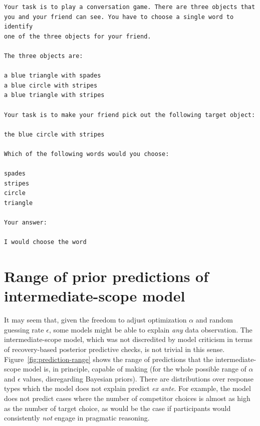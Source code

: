 \documentclass[fleqn]{article}
\begin{document}
\begin{verbatim}
Your task is to play a conversation game. There are three objects that
you and your friend can see. You have to choose a single word to identify
one of the three objects for your friend.

The three objects are:

a blue triangle with spades
a blue circle with stripes
a blue triangle with stripes

Your task is to make your friend pick out the following target object:

the blue circle with stripes

Which of the following words would you choose:

spades
stripes
circle
triangle

Your answer:

I would choose the word
\end{verbatim}


\section{Range of prior predictions of intermediate-scope model}
\label{sec:range-prior-pred}

It may seem that, given the freedom to adjust optimization $\alpha$ and random guessing rate $\epsilon$, some models might be able to explain \emph{any} data observation.
The intermediate-scope model, which was not discredited by model criticism in terms of recovery-based posterior predictive checks, is not trivial in this sense.
Figure~\ref{fig:prediction-range} shows the range of predictions that the intermediate-scope model is, in principle, capable of making (for the whole possible range of \(\alpha\) and \(\epsilon\) values, disregarding Bayesian priors).
There are distributions over response types which the model does not explain predict \emph{ex ante}.
For example, the model does not predict cases where the number of competitor choices is almost as high as the number of target choice, as would be the case if participants would consistently \emph{not} engage in pragmatic reasoning.
\end{document}
